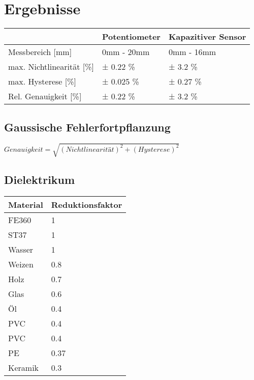 \section{Ergebnisse}

\begin{tabular}{ l | l | l}
    \hline
                              & Potentiometer  & Kapazitiver Sensor  \\ \hline
    Messbereich [mm]          & 0mm - 20mm     & 0mm - 16mm          \\ \hline
    max. Nichtlinearität [\%] & ± 0.22 \%      & ± 3.2 \%            \\ \hline
    max. Hysterese [\%]       & ± 0.025 \%     & ± 0.27 \%           \\ \hline
    Rel. Genauigkeit [\%]     & ± 0.22 \%      & ± 3.2 \%            \\ \hline
\end{tabular}

\vspace*{1em}
\subsection{Gaussische Fehlerfortpflanzung}

$Genauigkeit = \sqrt{(Nichtlinearität)^2 + (Hysterese)^2}$



\subsection{Dielektrikum}

\begin{tabular}{| l | l |}
    \hline
    Material  & Reduktionsfaktor \\
    \hline
    FE360     & 1\\
    ST37      & 1\\
    Wasser    & 1\\
    Weizen    & 0.8\\
    Holz      & 0.7\\
    Glas      & 0.6\\
    Öl        & 0.4\\
    PVC       & 0.4\\
    PVC       & 0.4\\
    PE        & 0.37\\
    Keramik   & 0.3 \\
    \hline
\end{tabular}

\vspace*{1em}

\clearpage

